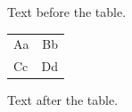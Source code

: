 \documentclass[12pt]{article}
\begin{document}
Text before the table.

\begin{tabular}{|@{}l|r@{}|}Aa & Bb\\Cc & Dd\end{tabular}

Text after the table.
\end{document}
